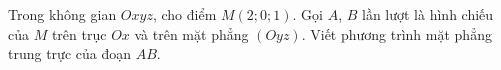 \begin{ex}
Trong không gian $Oxyz$, cho điểm $M(2;0;1)$. Gọi $A$, $B$ lần lượt là hình chiếu của $M$ trên trục $Ox$ và trên mặt phẳng $(Oyz)$. Viết phương trình mặt phẳng trung trực của đoạn $AB$.
\end{ex}

